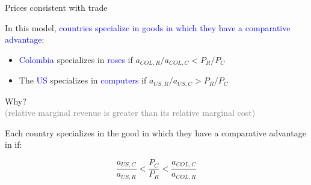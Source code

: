 \documentclass[notes,11pt, aspectratio=169, xcolor=table]{beamer}
\newcommand{\blue}[1]{\textcolor{blue}{#1}}
\newenvironment{wideitemize}{\itemize\addtolength{\itemsep}{10pt}}{\enditemize}
\begin{document}
\begin{frame}{Prices consistent with trade}

\begin{wideitemize}

    \item In this model, \blue{countries specialize in goods in which they have a comparative advantage}:
    
    \begin{itemize}
        \item \blue{Colombia} specializes in \blue{roses} if $a_{COL,R}/a_{COL,C} < P_R/P_C$
        \item The \blue{US} specializes in \blue{computers} if $a_{US,R}/a_{US,C} > P_R/P_C$
    \end{itemize}

    \item Why? \\
        \qquad \textcolor{gray}{(relative marginal revenue is greater than its relative marginal cost)}

    \item Each country specializes in the good in which they have a comparative advantage in if:

    \begin{equation*}\label{eq: price-trade}
        \frac{a_{US,C}}{a_{US,R}} < \frac{P_C}{P_R} < \frac{a_{COL,C}}{a_{COL,R}}
    \end{equation*}
    

\end{wideitemize}

\end{frame}
\end{document}

